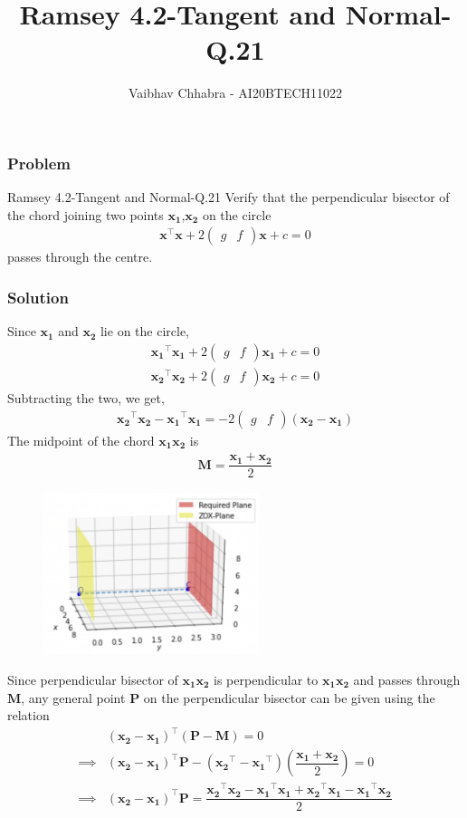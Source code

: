 \documentclass{beamer}
\title{Ramsey 4.2-Tangent and Normal-Q.21}
\author{Vaibhav Chhabra - AI20BTECH11022}
\newcommand{\myvec}[1]{\ensuremath{\begin{pmatrix}#1\end{pmatrix}}}
\renewcommand{\vec}[1]{\mathbf{#1}}
\begin{document}
\begin{frame}
\titlepage
\end{frame}
\begin{frame}
\frametitle{Problem}
\begin{block}{Ramsey 4.2-Tangent and Normal-Q.21}
    Verify that the perpendicular bisector of the chord joining two points $\vec{x_1}$,$\vec{x_2}$ on the circle
    \begin{align}
        \vec{x}^\top\vec{x}+2\myvec{g&f}\vec{x}+c=0
    \end{align}
    passes through the centre.
\end{block}
\end{frame}
\begin{frame}
\frametitle{Solution}
Since $\vec{x_1}$ and $\vec{x_2}$ lie on the circle,
\begin{align}
       \vec{x_1}^\top\vec{x_1}+2\myvec{g&f}\vec{x_1}+c=0\\
       \vec{x_2}^\top\vec{x_2}+2\myvec{g&f}\vec{x_2}+c=0
\end{align}
Subtracting the two, we get,
\begin{align}
    \vec{x_2}^\top\vec{x_2}-\vec{x_1}^\top\vec{x_1}=-2\myvec{g&f}(\vec{x_2}-\vec{x_1}) \label{a}
\end{align}
The midpoint of the chord $\vec{x_1x_2}$ is 
\begin{align}
    \vec{M}=\dfrac{\vec{x_1}+\vec{x_2}}{2}
\end{align}
\end{frame}
\begin{frame}
\begin{figure}[h!]
    \centering
    \includegraphics[width=6.3cm]{figure.png}
\end{figure}
Since perpendicular bisector of $\vec{x_1x_2}$ is perpendicular to $\vec{x_1x_2}$ and passes through $\vec{M}$, any general point $\vec{P}$ on the perpendicular bisector can be given using the relation
\begin{align}
    &\left(\vec{x_2}-\vec{x_1}\right)^\top\left(\vec{P}-\vec{M}\right)=0\\
    \implies &\left(\vec{x_2}-\vec{x_1}\right)^\top\vec{P}-\left(\vec{x_2}^\top-\vec{x_1}^\top\right)\left(\dfrac{\vec{x_1}+\vec{x_2}}{2}\right)=0\\
    \implies &\left(\vec{x_2}-\vec{x_1}\right)^\top\vec{P}=\dfrac{\vec{x_2}^\top\vec{x_2}-\vec{x_1}^\top\vec{x_1}+\vec{x_2}^\top\vec{x_1}-\vec{x_1}^\top\vec{x_2}}{2}
\end{align}
\end{frame}
\end{document}
